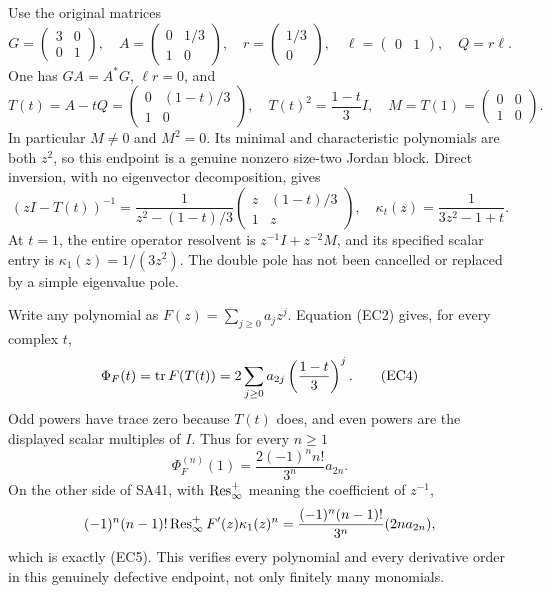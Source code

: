 \documentclass[11pt]{article}
\begin{document}
Use the original matrices
\begin{equation}
 G=\begin{pmatrix}3&0\\0&1\end{pmatrix},\quad
 A=\begin{pmatrix}0&1/3\\1&0\end{pmatrix},\quad
 r=\begin{pmatrix}1/3\\0\end{pmatrix},\quad
 \ell=\begin{pmatrix}0&1\end{pmatrix},\quad Q=r\ell.
 \tag{EC1}
\end{equation}
One has \(GA=A^*G\), \(\ell r=0\), and
\begin{equation}
 T(t)=A-tQ=\begin{pmatrix}0&(1-t)/3\\1&0\end{pmatrix},
 \quad T(t)^2=\frac{1-t}{3}I,\quad
 M=T(1)=\begin{pmatrix}0&0\\1&0\end{pmatrix}.
 \tag{EC2}
\end{equation}
In particular \(M\ne0\) and \(M^2=0\). Its minimal and
characteristic polynomials are both \(z^2\), so this endpoint is a
genuine nonzero size-two Jordan block.
Direct inversion, with no eigenvector decomposition, gives
\begin{equation}
 (zI-T(t))^{-1}
 =\frac1{z^2-(1-t)/3}
     \begin{pmatrix}z&(1-t)/3\\1&z\end{pmatrix},
 \quad
 \kappa_t(z)=\frac1{3z^2-1+t}.
 \tag{EC3}
\end{equation}
At \(t=1\), the entire operator resolvent is
\(z^{-1}I+z^{-2}M\), and its specified scalar entry is
\(\kappa_1(z)=1/(3z^2)\). The double pole has not been
cancelled or replaced by a simple eigenvalue pole.

Write any polynomial as \(F(z)=\sum_{j\ge0}a_jz^j\).
Equation (EC2) gives, for every complex \(t\),
\begin{equation}
 \Phi_F(t)=\operatorname{tr} F(T(t))
     =2\sum_{j\ge0}a_{2j}\left(\frac{1-t}{3}\right)^j .
 \tag{EC4}
\end{equation}
Odd powers have trace zero because \(T(t)\) does, and even
powers are the displayed scalar multiples of \(I\).
Thus for every \(n\ge1\)
\begin{equation}
 \Phi_F^{(n)}(1)=\frac{2(-1)^n n!}{3^n}a_{2n}.
 \tag{EC5}
\end{equation}
On the other side of SA41, with \(\operatorname{Res}_\infty^+\) meaning the
coefficient of \(z^{-1}\),
\[
 (-1)^n(n-1)!\operatorname{Res}_\infty^+F'(z)\kappa_1(z)^n
 =\frac{(-1)^n(n-1)!}{3^n}(2n a_{2n}),
\]
which is exactly (EC5). This verifies every polynomial and
every derivative order in this genuinely defective endpoint,
not only finitely many monomials.
\end{document}

